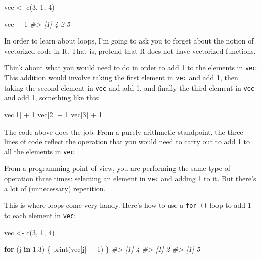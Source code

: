 \documentclass[
]{book}
\newenvironment{Shaded}{\begin{snugshade}}{\end{snugshade}}
\newcommand{\CommentTok}[1]{\textcolor[rgb]{0.56,0.35,0.01}{\textit{#1}}}
\newcommand{\ControlFlowTok}[1]{\textcolor[rgb]{0.13,0.29,0.53}{\textbf{#1}}}
\newcommand{\DecValTok}[1]{\textcolor[rgb]{0.00,0.00,0.81}{#1}}
\newcommand{\FunctionTok}[1]{\textcolor[rgb]{0.00,0.00,0.00}{#1}}
\newcommand{\NormalTok}[1]{#1}
\newcommand{\OtherTok}[1]{\textcolor[rgb]{0.56,0.35,0.01}{#1}}
\newcommand{\SpecialCharTok}[1]{\textcolor[rgb]{0.00,0.00,0.00}{#1}}
\begin{document}
\begin{Shaded}
\begin{Highlighting}[]
\NormalTok{vec }\OtherTok{\textless{}{-}} \FunctionTok{c}\NormalTok{(}\DecValTok{3}\NormalTok{, }\DecValTok{1}\NormalTok{, }\DecValTok{4}\NormalTok{) }

\NormalTok{vec }\SpecialCharTok{+} \DecValTok{1}
\CommentTok{\#\textgreater{} [1] 4 2 5}
\end{Highlighting}
\end{Shaded}

In order to learn about loops, I'm going to ask you to forget about the notion
of vectorized code in R. That is, pretend that R does not have vectorized functions.

Think about what you would need to do in order to add 1 to the elements
in \texttt{vec}. This addition would involve taking the first element in \texttt{vec} and
add 1, then taking the second element in \texttt{vec} and add 1, and finally the third
element in \texttt{vec} and add 1, something like this:

\begin{Shaded}
\begin{Highlighting}[]
\NormalTok{vec[}\DecValTok{1}\NormalTok{] }\SpecialCharTok{+} \DecValTok{1}
\NormalTok{vec[}\DecValTok{2}\NormalTok{] }\SpecialCharTok{+} \DecValTok{1}
\NormalTok{vec[}\DecValTok{3}\NormalTok{] }\SpecialCharTok{+} \DecValTok{1}
\end{Highlighting}
\end{Shaded}

The code above does the job. From a purely arithmetic standpoint, the three
lines of code reflect the operation that you would need to carry out to add
1 to all the elements in \texttt{vec}.

From a programming point of view, you are performing the same type of operation
three times: selecting an element in \texttt{vec} and adding 1 to it. But there's
a lot of (unnecessary) repetition.

This is where loops come very handy. Here's how to use a \texttt{for\ ()} loop
to add 1 to each element in \texttt{vec}:

\begin{Shaded}
\begin{Highlighting}[]
\NormalTok{vec }\OtherTok{\textless{}{-}} \FunctionTok{c}\NormalTok{(}\DecValTok{3}\NormalTok{, }\DecValTok{1}\NormalTok{, }\DecValTok{4}\NormalTok{)}

\ControlFlowTok{for}\NormalTok{ (j }\ControlFlowTok{in} \DecValTok{1}\SpecialCharTok{:}\DecValTok{3}\NormalTok{) \{}
  \FunctionTok{print}\NormalTok{(vec[j] }\SpecialCharTok{+} \DecValTok{1}\NormalTok{)}
\NormalTok{\}}
\CommentTok{\#\textgreater{} [1] 4}
\CommentTok{\#\textgreater{} [1] 2}
\CommentTok{\#\textgreater{} [1] 5}
\end{Highlighting}
\end{Shaded}
\end{document}
